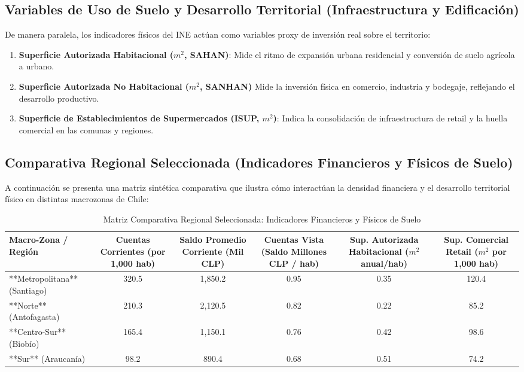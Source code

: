 \documentclass[11pt,a4paper]{article}
\begin{document}
\subsection{Variables de Uso de Suelo y Desarrollo Territorial (Infraestructura y Edificación)}
De manera paralela, los indicadores físicos del INE actúan como variables proxy de inversión real sobre el territorio:
\begin{enumerate}
  \item \textbf{Superficie Autorizada Habitacional ($m^2$, SAHAN)}: Mide el ritmo de expansión urbana residencial y conversión de suelo agrícola a urbano.
  \item \textbf{Superficie Autorizada No Habitacional ($m^2$, SANHAN)} Mide la inversión física en comercio, industria y bodegaje, reflejando el desarrollo productivo.
  \item \textbf{Superficie de Establecimientos de Supermercados (ISUP, $m^2$)}: Indica la consolidación de infraestructura de retail y la huella comercial en las comunas y regiones.

\end{enumerate}

\subsection{Comparativa Regional Seleccionada (Indicadores Financieros y Físicos de Suelo)}
A continuación se presenta una matriz sintética comparativa que ilustra cómo interactúan la densidad financiera y el desarrollo territorial físico en distintas macrozonas de Chile:

\begin{table}[H]
\centering
\caption{Matriz Comparativa Regional Seleccionada: Indicadores Financieros y Físicos de Suelo}
\begin{adjustbox}{width=\textwidth}
\begin{tabular}{lccccc}
\toprule
Macro-Zona / Región & Cuentas Corrientes (por 1,000 hab) & Saldo Promedio Corriente (Mil CLP) & Cuentas Vista (Saldo Millones CLP / hab) & Sup. Autorizada Habitacional ($m^2$ anual/hab) & Sup. Comercial Retail ($m^2$ por 1,000 hab) \\
\midrule
**Metropolitana** (Santiago) & 320.5 & 1,850.2 & 0.95 & 0.35 & 120.4 \\
**Norte** (Antofagasta) & 210.3 & 2,120.5 & 0.82 & 0.22 & 85.2 \\
**Centro-Sur** (Biobío) & 165.4 & 1,150.1 & 0.76 & 0.42 & 98.6 \\
**Sur** (Araucanía) & 98.2 & 890.4 & 0.68 & 0.51 & 74.2 \\
\bottomrule
\end{tabular}
\end{adjustbox}
\end{table}
\end{document}
